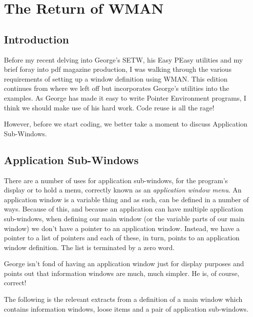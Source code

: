 \chapter{The Return of WMAN}

\section{Introduction}
\label{ch27-intro}%

Before my recent delving into George's
 SETW, his Easy PEasy     utilities and my brief foray into pdf magazine production, I was walking
    through the various requirements of setting up a window definition using
    WMAN. This edition continues from where we left off but incorporates
    George's utilities into the examples. As George has made it easy to write
    Pointer Environment programs, I think we should make use of his hard work.
    Code reuse is all the rage!

However, before we start coding, we better take a moment to discuss
    Application Sub-{}Windows.

\section{Application Sub-{}Windows}
\label{ch27-appl-wins}%

There are a number of uses for application sub-{}windows, for the
    program's display or to hold a menu, correctly known as an
 \emph{application window menu}. An application window is a
    variable thing and as such, can be defined in a number of ways. Because of
    this, and because an application can have multiple application
    sub-{}windows, when defining our main window (or the variable parts of our
    main window) we don't have a pointer to an application window. Instead, we
    have a pointer to a list of pointers and each of these, in turn, points to
    an application window definition. The list is terminated by a zero
    word.

\begin{note}
George isn't fond of having an application window just for display purposes and points out that information windows are much, much simpler. He is, of course, correct!
\end{note}  

The following is the relevant extracts from a definition of a main
    window which contains information windows, loose items and a pair of
    application sub-{}windows.

